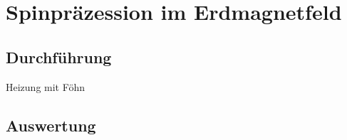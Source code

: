 \section{Spinpräzession im Erdmagnetfeld}
\subsection{Durchführung}
Heizung mit Föhn
\subsection{Auswertung}